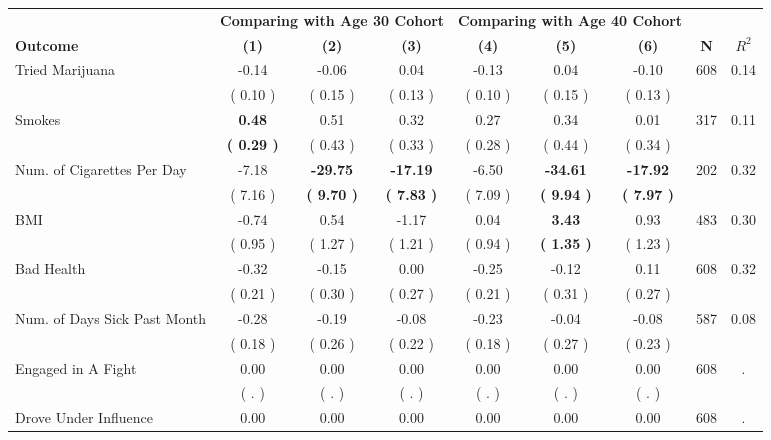 \begin{tabular}{lcccccccc}
\toprule
 & \multicolumn{3}{c}{\textbf{Comparing with Age 30 Cohort}} & \multicolumn{3}{c}{\textbf{Comparing with Age 40 Cohort}} & \\
\cmidrule(lr){2-4} \cmidrule(lr){5-7} 
 \textbf{Outcome} & \textbf{(1)} & \textbf{(2)} & \textbf{(3)} & \textbf{(4)} & \textbf{(5)} & \textbf{(6)} & \textbf{N} & \textbf{$ R^2$} \\
\midrule
Tried Marijuana &     -0.14 &     -0.06 &      0.04 &     -0.13 &      0.04 &     -0.10 & 608 &       0.14 \\ 
 & (     0.10 ) & (     0.15 ) & (     0.13 ) & (     0.10 ) & (     0.15 ) & (     0.13 ) & \\
Smokes & \textbf{     0.48} &      0.51 &      0.32 &      0.27 &      0.34 &      0.01 & 317 &       0.11 \\ 
 & \textbf{(     0.29 )} & (     0.43 ) & (     0.33 ) & (     0.28 ) & (     0.44 ) & (     0.34 ) & \\
Num. of Cigarettes Per Day &     -7.18 & \textbf{   -29.75} & \textbf{   -17.19} &     -6.50 & \textbf{   -34.61} & \textbf{   -17.92} & 202 &       0.32 \\ 
 & (     7.16 ) & \textbf{(     9.70 )} & \textbf{(     7.83 )} & (     7.09 ) & \textbf{(     9.94 )} & \textbf{(     7.97 )} & \\
BMI &     -0.74 &      0.54 &     -1.17 &      0.04 & \textbf{     3.43} &      0.93 & 483 &       0.30 \\ 
 & (     0.95 ) & (     1.27 ) & (     1.21 ) & (     0.94 ) & \textbf{(     1.35 )} & (     1.23 ) & \\
Bad Health &     -0.32 &     -0.15 &      0.00 &     -0.25 &     -0.12 &      0.11 & 608 &       0.32 \\ 
 & (     0.21 ) & (     0.30 ) & (     0.27 ) & (     0.21 ) & (     0.31 ) & (     0.27 ) & \\
Num. of Days Sick Past Month &     -0.28 &     -0.19 &     -0.08 &     -0.23 &     -0.04 &     -0.08 & 587 &       0.08 \\ 
 & (     0.18 ) & (     0.26 ) & (     0.22 ) & (     0.18 ) & (     0.27 ) & (     0.23 ) & \\
Engaged in A Fight &      0.00 &      0.00 &      0.00 &      0.00 &      0.00 &      0.00 & 608 &          . \\ 
 & (        . ) & (        . ) & (        . ) & (        . ) & (        . ) & (        . ) & \\
Drove Under Influence &      0.00 &      0.00 &      0.00 &      0.00 &      0.00 &      0.00 & 608 &          . \\ 

\end{tabular}
